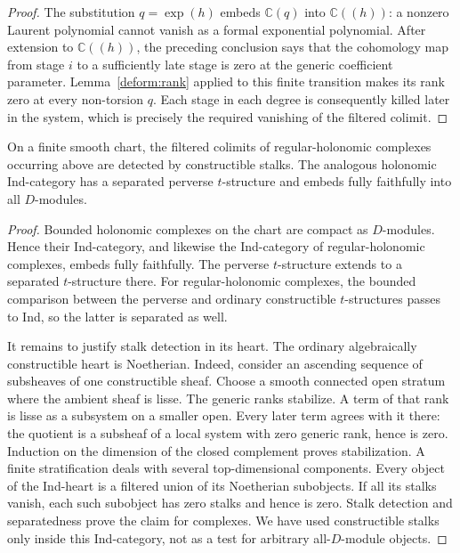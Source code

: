 \begin{proof}
The substitution $q=\exp(h)$ embeds $\mathbb C(q)$ into
$\mathbb C((h))$: a nonzero Laurent polynomial cannot
vanish as a formal exponential polynomial.  After extension
to $\mathbb C((h))$, the preceding conclusion says that the
cohomology map from stage $i$ to a sufficiently late stage is
zero at the generic coefficient parameter.  Lemma~\ref{deform:rank}
applied to this finite transition makes its rank zero at every
non-torsion $q$.  Each stage in each degree is consequently
killed later in the system, which is precisely the required
vanishing of the filtered colimit.
\end{proof}

\begin{lemma}
\label{deform:stalks}
On a finite smooth chart, the filtered colimits of regular-holonomic
complexes occurring above are detected by constructible stalks.
The analogous holonomic Ind-category has a separated perverse
$t$-structure and embeds fully faithfully into all $D$-modules.
\end{lemma}

\begin{proof}
Bounded holonomic complexes on the chart are compact as
$D$-modules.  Hence their Ind-category, and likewise the Ind-category
of regular-holonomic complexes, embeds fully faithfully.  The
perverse $t$-structure extends to a separated $t$-structure there.
For regular-holonomic complexes, the bounded comparison between
the perverse and ordinary constructible $t$-structures passes to
Ind, so the latter is separated as well.

It remains to justify stalk detection in its heart.  The ordinary
algebraically constructible heart is Noetherian.  Indeed, consider
an ascending sequence of subsheaves of one constructible sheaf.
Choose a smooth connected open stratum where the ambient sheaf
is lisse.  The generic ranks stabilize.  A term of that rank is
lisse as a subsystem on a smaller open.  Every later term agrees
with it there: the quotient is a subsheaf of a local system with
zero generic rank, hence is zero.  Induction on the dimension of
the closed complement proves stabilization.  A finite
stratification deals with several top-dimensional components.
Every object of the Ind-heart is a filtered union of its
Noetherian subobjects.  If all its stalks vanish, each such
subobject has zero stalks and hence is zero.  Stalk detection
and separatedness prove the claim for complexes.  We have used
constructible stalks only inside this Ind-category, not as a
test for arbitrary all-$D$-module objects.
\end{proof}

